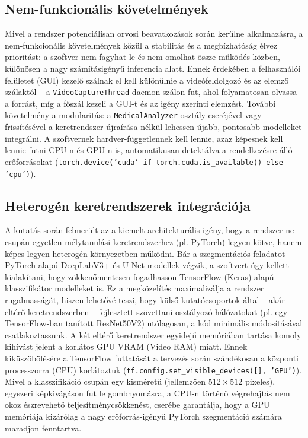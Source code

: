 \documentclass[12pt, a4paper]{report}
\begin{document}
\subsection{Nem-funkcionális követelmények}
Mivel a rendszer potenciálisan orvosi beavatkozások során kerülne alkalmazásra, a nem-funkcionális követelmények közül a stabilitás és a megbízhatóság élvez prioritást: a szoftver nem fagyhat le és nem omolhat össze működés közben, különösen a nagy számításigényű inferencia alatt. Ennek érdekében a felhasználói felületet (GUI) kezelő szálnak el kell különülnie a videófeldolgozó és az elemző szálaktól – a \texttt{VideoCaptureThread} daemon szálon fut, ahol folyamatosan olvassa a forrást, míg a főszál kezeli a GUI-t és az igény szerinti elemzést. További követelmény a modularitás: a \texttt{MedicalAnalyzer} osztály cseréjével vagy frissítésével a keretrendszer újraírása nélkül lehessen újabb, pontosabb modelleket integrálni. A szoftvernek hardver-függetlennek kell lennie, azaz képesnek kell lennie futni CPU-n és GPU-n is, automatikusan detektálva a rendelkezésre álló erőforrásokat (\texttt{torch.device('cuda' if torch.cuda.is\_available() else 'cpu')}).

\subsection{Heterogén keretrendszerek integrációja}
A kutatás során felmerült az a kiemelt architekturális igény, hogy a rendszer ne csupán egyetlen mélytanulási keretrendszerhez (pl. PyTorch) legyen kötve, hanem képes legyen heterogén környezetben működni. Bár a szegmentációs feladatot PyTorch alapú DeepLabV3+ és U-Net modellek végzik, a szoftvert úgy kellett kialakítani, hogy zökkenőmentesen fogadhasson TensorFlow (Keras) alapú klasszifikátor modelleket is. Ez a megközelítés maximalizálja a rendszer rugalmasságát, hiszen lehetővé teszi, hogy külső kutatócsoportok által – akár eltérő keretrendszerben – fejlesztett szövettani osztályozó hálózatokat (pl. egy TensorFlow-ban tanított ResNet50V2) utólagosan, a kód minimális módosításával csatlakoztassunk. A két eltérő keretrendszer egyidejű memóriában tartása komoly kihívást jelent a korlátos GPU VRAM (Video RAM) miatt. Ennek kiküszöbölésére a TensorFlow futtatását a tervezés során szándékosan a központi processzorra (CPU) korlátoztuk (\texttt{tf.config.set\_visible\_devices([], 'GPU')}). Mivel a klasszifikáció csupán egy kisméretű (jellemzően $512 \times 512$ pixeles), egyszeri képkivágáson fut le gombnyomásra, a CPU-n történő végrehajtás nem okoz észrevehető teljesítménycsökkenést, cserébe garantálja, hogy a GPU memóriája kizárólag a nagy erőforrás-igényű PyTorch szegmentáció számára maradjon fenntartva.
\end{document}

